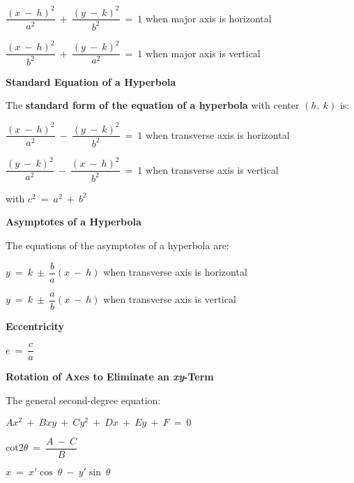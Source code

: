 \documentclass{article}
\begin{document}
\begin{large}
\hspace{1.5in} $\dfrac{(x\ -\ h)^{2}}{a^{2}}\ +\ \dfrac{(y\ -\ k)^{2}}{b^{2}}\ =\ 1$ when major axis is horizontal

\hspace{1.5in} $\dfrac{(x\ -\ h)^{2}}{b^{2}}\ +\ \dfrac{(y\ -\ k)^{2}}{a^{2}}\ =\ 1$ when major axis is vertical

\vspace{0.5in}
\textbf{Standard Equation of a Hyperbola}

\hspace{0.1in} The \textbf{standard form of the equation of a hyperbola} with center $(h,\ k)$ is:

\hspace{1.0in} $\dfrac{(x\ -\ h)^{2}}{a^{2}}\ -\ \dfrac{(y\ -\ k)^{2}}{b^{2}}\ =\ 1$ when transverse axis is horizontal

\hspace{1.0in} $\dfrac{(y\ -\ k)^{2}}{a^{2}}\ -\ \dfrac{(x\ -\ h)^{2}}{b^{2}}\ =\ 1$ when transverse axis is vertical

\hspace{2.0in} with $c^{2}\ =\ a^{2}\ +\ b^{2}$

\vspace{-0.1in}

\textbf{Asymptotes of a Hyperbola}

\hspace{0.1in} The equations of the asymptotes of a hyperbola are:

\hspace{1.2in} $y\ =\ k\ \pm\ \dfrac{b}{a}(x\ -\ h)$ when transverse axis is horizontal

\hspace{1.2in} $y\ =\ k\ \pm\ \dfrac{a}{b}(x\ -\ h)$ when transverse axis is vertical

\textbf{Eccentricity}

\hspace{2.0in} $e\ =\ \dfrac{c}{a}$

\textbf{Rotation of Axes to Eliminate an \textit{xy}-Term}

\hspace{0.1in} The general second-degree equation:

\hspace{1.0in} $Ax^{2}\ +\ Bxy\ +\ Cy^{2}\ +\ Dx\ +\ Ey\ +\ F\ =\ 0$

\hspace{2.0in} $\text{cot}2\theta\ =\ \dfrac{A\ -\ C}{B}$

\hspace{1.75in} $x\ =\ x'\cos \ \theta\ -\ y'\sin \ \theta$


\end{large}
\end{document}
